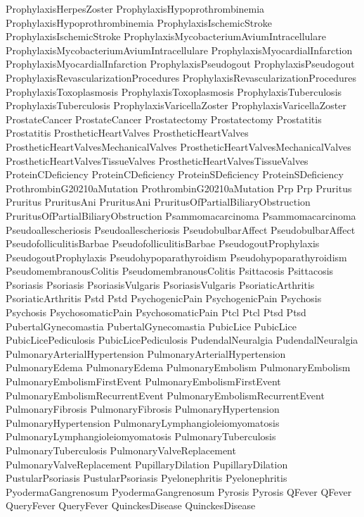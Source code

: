 ProphylaxisHerpesZoster
 ProphylaxisHypoprothrombinemia
 ProphylaxisHypoprothrombinemia
 ProphylaxisIschemicStroke
 ProphylaxisIschemicStroke
 ProphylaxisMycobacteriumAviumIntracellulare
 ProphylaxisMycobacteriumAviumIntracellulare
 ProphylaxisMyocardialInfarction
 ProphylaxisMyocardialInfarction
 ProphylaxisPseudogout
 ProphylaxisPseudogout
 ProphylaxisRevascularizationProcedures
 ProphylaxisRevascularizationProcedures
 ProphylaxisToxoplasmosis
 ProphylaxisToxoplasmosis
 ProphylaxisTuberculosis
 ProphylaxisTuberculosis
 ProphylaxisVaricellaZoster
 ProphylaxisVaricellaZoster
 ProstateCancer
 ProstateCancer
 Prostatectomy
 Prostatectomy
 Prostatitis
 Prostatitis
 ProstheticHeartValves
 ProstheticHeartValves
 ProstheticHeartValvesMechanicalValves
 ProstheticHeartValvesMechanicalValves
 ProstheticHeartValvesTissueValves
 ProstheticHeartValvesTissueValves
 ProteinCDeficiency
 ProteinCDeficiency
 ProteinSDeficiency
 ProteinSDeficiency
 ProthrombinG20210aMutation
 ProthrombinG20210aMutation
 Prp
 Prp
 Pruritus
 Pruritus
 PruritusAni
 PruritusAni
 PruritusOfPartialBiliaryObstruction
 PruritusOfPartialBiliaryObstruction
 Psammomacarcinoma
 Psammomacarcinoma
 Pseudoallescheriosis
 Pseudoallescheriosis
 PseudobulbarAffect
 PseudobulbarAffect
 PseudofolliculitisBarbae
 PseudofolliculitisBarbae
 PseudogoutProphylaxis
 PseudogoutProphylaxis
 Pseudohypoparathyroidism
 Pseudohypoparathyroidism
 PseudomembranousColitis
 PseudomembranousColitis
 Psittacosis
 Psittacosis
 Psoriasis
 Psoriasis
 PsoriasisVulgaris
 PsoriasisVulgaris
 PsoriaticArthritis
 PsoriaticArthritis
 Pstd
 Pstd
 PsychogenicPain
 PsychogenicPain
 Psychosis
 Psychosis
 PsychosomaticPain
 PsychosomaticPain
 Ptcl
 Ptcl
 Ptsd
 Ptsd
 PubertalGynecomastia
 PubertalGynecomastia
 PubicLice
 PubicLice
 PubicLicePediculosis
 PubicLicePediculosis
 PudendalNeuralgia
 PudendalNeuralgia
 PulmonaryArterialHypertension
 PulmonaryArterialHypertension
 PulmonaryEdema
 PulmonaryEdema
 PulmonaryEmbolism
 PulmonaryEmbolism
 PulmonaryEmbolismFirstEvent
 PulmonaryEmbolismFirstEvent
 PulmonaryEmbolismRecurrentEvent
 PulmonaryEmbolismRecurrentEvent
 PulmonaryFibrosis
 PulmonaryFibrosis
 PulmonaryHypertension
 PulmonaryHypertension
 PulmonaryLymphangioleiomyomatosis
 PulmonaryLymphangioleiomyomatosis
 PulmonaryTuberculosis
 PulmonaryTuberculosis
 PulmonaryValveReplacement
 PulmonaryValveReplacement
 PupillaryDilation
 PupillaryDilation
 PustularPsoriasis
 PustularPsoriasis
 Pyelonephritis
 Pyelonephritis
 PyodermaGangrenosum
 PyodermaGangrenosum
 Pyrosis
 Pyrosis
 QFever
 QFever
 QueryFever
 QueryFever
 QuinckesDisease
 QuinckesDisease
